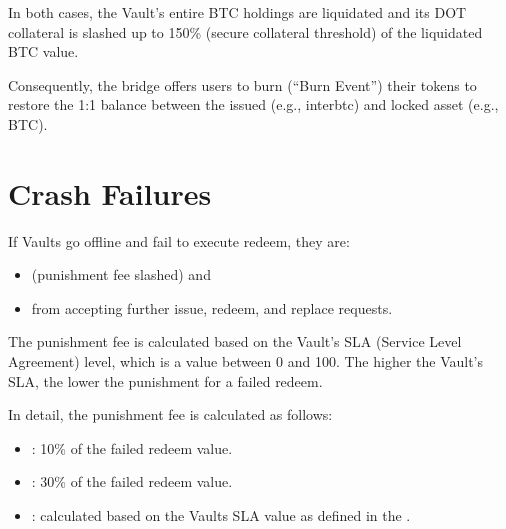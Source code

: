 \documentclass[a4paper,10pt,english]{sphinxmanual}
\begin{document}
In both cases, the Vault’s entire BTC holdings are liquidated and its DOT collateral is slashed \sphinxhyphen{} up to 150\% (secure collateral threshold) of the liquidated BTC value.

Consequently, the bridge offers users to burn (“Burn Event”) their tokens to restore the 1:1 balance between the issued (e.g., interbtc) and locked asset (e.g., BTC).


\section{Crash Failures}
\label{\detokenize{security_performance/liquidations:crash-failures}}
If Vaults go offline and fail to execute redeem, they are:
\begin{itemize}
\item {} 
 (punishment fee slashed) and

\item {} 
 from accepting further issue, redeem, and replace requests.

\end{itemize}

The punishment fee is calculated based on the Vault’s SLA (Service Level Agreement) level, which is a value between 0 and 100. The higher the Vault’s SLA, the lower the punishment for a failed redeem.

In detail, the punishment fee is calculated as follows:
\begin{itemize}
\item {} 
: 10\% of the failed redeem value.

\item {} 
: 30\% of the failed redeem value.

\item {} 
: calculated based on the Vaults SLA value as defined in the {\hyperref[\detokenize{spec/sla:slashamountvault}]{}}.

\end{itemize}
\end{document}
